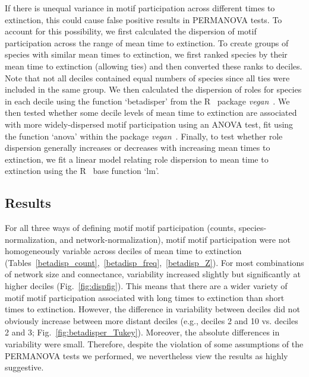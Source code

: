 \documentclass[12pt]{article}
\begin{document}
\begin{spacing}{2.0}
        If there is unequal variance in motif participation across different times to extinction, this could cause false positive results in PERMANOVA tests.
        To account for this possibility, we first calculated the dispersion of motif participation across the range of mean time to extinction.
        To create groups of species with similar mean times to extinction, we first ranked species by their mean time to extinction (allowing ties) and then converted these ranks to deciles. 
        Note that not all deciles contained equal numbers of species since all ties were included in the same group.
        We then calculated the dispersion of roles for species in each decile using the function `betadisper' from the R~\citep{R} package \emph{vegan}~\citep{vegan}.
        We then tested whether some decile levels of mean time to extinction are associated with more widely-dispersed motif participation using an ANOVA test, fit using the function `anova' within the package \emph{vegan}~\citep{vegan}.
        Finally, to test whether role dispersion generally increases or decreases with increasing mean times to extinction, we fit a linear model relating role dispersion to mean time to extinction using the R~\citep{R} base function `lm'.


	\subsection*{Results}

        For all three ways of defining motif motif participation (counts, species-normalization, and network-normalization), motif motif participation were not homogeneously variable across deciles of mean time to extinction (Tables~\ref{betadisp_count},~\ref{betadisp_freq},~\ref{betadisp_Z}). 
        For most combinations of network size and connectance, variability increased slightly but significantly at higher deciles (Fig.~\ref{fig:dispfig}).
        This means that there are a wider variety of motif motif participation associated with long times to extinction than short times to extinction.
        However, the difference in variability between deciles did not obviously increase between more distant deciles (e.g., deciles 2 and 10 vs. deciles 2 and 3; Fig.~\ref{fig:betadisper_Tukey}).
        Moreover, the absolute differences in variability were small.
        Therefore, despite the violation of some assumptions of the PERMANOVA tests we performed, we nevertheless view the results as highly suggestive.


\end{spacing}
\end{document}
